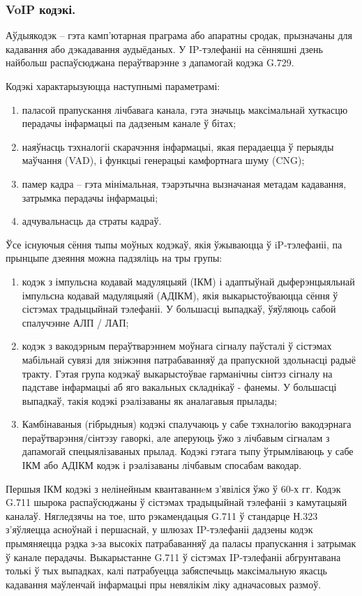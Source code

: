 \subsubsection{VoIP кодэкі.}

Аўдыякодэк -- гэта камп'ютарная праграма або апаратны сродак, прызначаны для кадавання або дэкадавання аудыёданых. У IP-тэлефаніі на сённяшні дзень найбольш распаўсюджана пераўтварэнне з дапамогай кодэка G.729.

Кодэкі характарызуюцца наступнымі параметрамі:
\begin{enumerate}
    \item паласой прапускання лічбавага канала, гэта значыць максімальнай хуткасцю перадачы інфармацыі па дадзеным канале ў бітах;
    \item наяўнасць тэхналогіі скарачэння інфармацыі, якая перадаецца ў перыяды маўчання (VAD), і функцыі генерацыі камфортнага шуму (CNG);
    \item памер кадра -- гэта мінімальная, тэарэтычна вызначаная метадам кадавання, затрымка перадачы інфармацыі;
    \item адчувальнасць да страты кадраў.
\end{enumerate}

Ўсе існуючыя сёння тыпы моўных кодэкаў, якія ўжываюцца ў iP-тэлефаніі, па прынцыпе дзеяння можна падзяліць на тры групы:
\begin{enumerate}
    \item кодэк з імпульсна кодавай мадуляцыяй (ІКМ) і адаптыўнай дыферэнцыяльнай імпульсна кодавай мадуляцыяй (АДІКМ), якія выкарыстоўваюцца сёння ў сістэмах традыцыйнай тэлефаніі. У большасці выпадкаў, ўяўляюць сабой спалучэнне АЛП / ЛАП;
    \item кодэк з вакодэрным пераўтварэннем моўнага сігналу паўсталі ў сістэмах мабільнай сувязі для зніжэння патрабаванняў да прапускной здольнасці радыё тракту. Гэтая група кодэкаў выкарыстоўвае гарманічны сінтэз сігналу на падставе інфармацыі аб яго вакальных складнікаў - фанемы. У большасці выпадкаў, такія кодэкі рэалізаваны як аналагавыя прылады;
    \item Камбінаваныя (гібрыдныя) кодэкі спалучаюць у сабе тэхналогію вакодэрнага пераўтварэння/сінтэзу гаворкі, але аперуюць ўжо з лічбавым сігналам з дапамогай спецыялізаваных прылад. Кодэкі гэтага тыпу ўтрымліваюць у сабе ІКМ або АДІКМ кодэк і рэалізаваны лічбавым спосабам вакодар.
\end{enumerate}

Першыя ІКМ кодэкі з нелінейным квантаваннeм з'явіліся ўжо ў 60-х гг. Кодэк G.711 шырока распаўсюджаны ў сістэмах традыцыйнай тэлефаніі з камутацыяй каналаў. Нягледзячы на тое, што рэкамендацыя G.711 ў стандарце Н.323 з'яўляецца асноўнай і першаснай, у шлюзах IP-тэлефаніі дадзены кодэк прымяняецца рэдка з-за высокіх патрабаванняў да паласы прапускання і затрымак ў канале перадачы. Выкарыстанне G.711 ў сістэмах IP-тэлефаніі абгрунтавана толькі ў тых выпадках, калі патрабуецца забяспечыць максімальную якасць кадавання маўленчай інфармацыі пры невялікім ліку адначасовых размоў.

